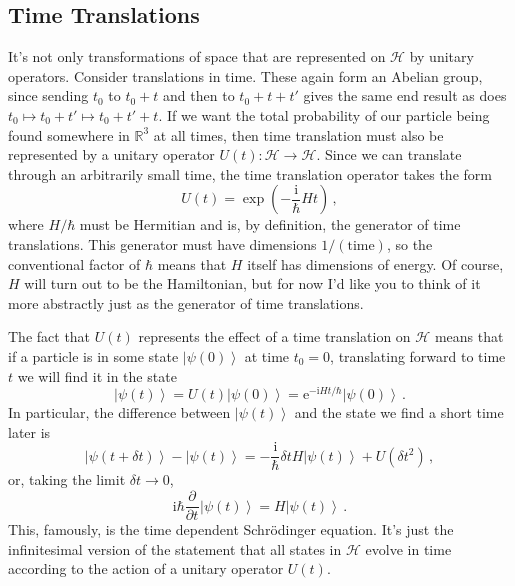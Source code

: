 \documentclass{article}
\theoremstyle{plain}\theoremheaderfont{\normalfont\itshape}\theorembodyfont{\rmfamily}\theoremseparator{.}\newtheorem*{rem}{Remark}\newtheorem*{ex}{Example}\newtheorem*{proof}{Proof}\newtheorem*{altp}{Alternative proof}
\theoremstyle{plain}\theoremheaderfont{\normalfont\bfseries}\theorembodyfont{\rmfamily}\theoremseparator{.}\newtheorem{thm}{Theorem}[section]\newtheorem{lem}[thm]{Lemma}\newtheorem{prop}[thm]{Proposition}\newtheorem*{cor}{Corollary}\newtheorem{defn}[thm]{Definition}\newtheorem{clm}[thm]{Claim}\newtheorem{clminproof}{Claim}
\theoremstyle{break}\theoremheaderfont{\normalfont\itshape}\theorembodyfont{\rmfamily}\theoremseparator{.\medskip}\newtheorem*{proofskip}{Proof}\newtheorem*{exs}{Examples}\newtheorem*{rems}{Remarks}
\theoremstyle{break}\theoremheaderfont{\normalfont\bfseries}\theorembodyfont{\rmfamily}\theoremseparator{.\medskip}\newtheorem{lemskip}[thm]{Lemma}\newtheorem{defnskip}[thm]{Definition}\newtheorem{propskip}[thm]{Proposition}\newtheorem{thmskip}[thm]{Theorem}
\numberwithin{equation}{section}
\newcommand{\ii}{\mathrm{i}}
\newcommand{\ee}{\mathrm{e}}
\newcommand{\pdv}[3][]{\frac{\partial^{#1} #2}{{\partial #3}^{#1}}}
\newcommand{\ket}[1]{\left| #1 \right\rangle}
\newcommand{\hb}{\mathcal{H}}
\newcommand{\RR}{\mathbb{R}}
\begin{document}
    \subsection{Time Translations}
    It's not only transformations of space that are represented on \(\hb\) by unitary operators. Consider translations in time. These again form an Abelian group, since sending \(t_0\) to \(t_0+t\) and then to \(t_0+t+t'\) gives the same end result as does \(t_0\mapsto t_0+t'\mapsto t_0+t'+t\). If we want the total probability of our particle being found somewhere in \(\RR^3\) at all times, then time translation must also be represented by a unitary operator \(U(t):\hb\to\hb\). Since we can translate through an arbitrarily small time, the time translation operator takes the form
    \begin{equation}
        U(t)=\exp\left(-\frac{\ii}{\hbar}Ht\right)\,,
    \end{equation}
    where \(H/\hbar\) must be Hermitian and is, by definition, the generator of time translations. This generator must have dimensions \(1/(\text{time})\), so the conventional factor of \(\hbar\) means that \(H\) itself has dimensions of energy. Of course, \(H\) will turn out to be the Hamiltonian, but for now I'd like you to think of it more abstractly just as the generator of time translations.

    The fact that \(U(t)\) represents the effect of a time translation on \(\hb\) means that if a particle is in some state \(\ket{\psi(0)}\) at time \(t_0=0\), translating forward to time \(t\) we will find it in the state
    \begin{equation}
        \ket{\psi(t)}=U(t)\ket{\psi(0)}=\ee^{-\ii Ht/\hbar}\ket{\psi(0)}\,.
    \end{equation}
    In particular, the difference between \(\ket{\psi(t)}\) and the state we find a short time later is
    \begin{equation}
        \ket{\psi(t+\delta t)}-\ket{\psi(t)}=-\frac{\ii}{\hbar}\delta tH\ket{\psi(t)}+U(\delta t^2)\,,
    \end{equation}
    or, taking the limit \(\delta t\to 0\),
    \begin{equation}
        \ii\hbar\pdv{}{t}\ket{\psi(t)}=H\ket{\psi(t)}\,.
    \end{equation}
    This, famously, is the time dependent Schr\"{o}dinger equation. It's just the infinitesimal version of the statement that all states in \(\hb\) evolve in time according to the action of a unitary operator \(U(t)\).
\end{document}
